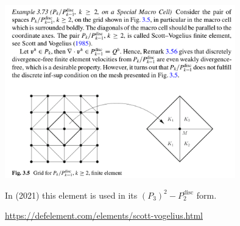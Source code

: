 \begin{center}
\includegraphics[width=10cm]{images/pair_scott_vogelius/john_scott_vogelius}\\
\end{center}


In \textcite{befh21} (2021) this element is used in its 
$(P_3)^2-P_2^{\text{disc}}$ form.

\begin{center}
\url{https://defelement.com/elements/scott-vogelius.html}
\end{center}

